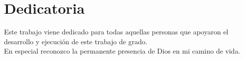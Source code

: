 \chapter*{Dedicatoria}

\noindent Este trabajo viene dedicado para todas aquellas personas que apoyaron el desarrollo
y ejecución de este trabajo de grado.\\

En especial reconozco la permanente presencia de Dios en mi camino de vida.
